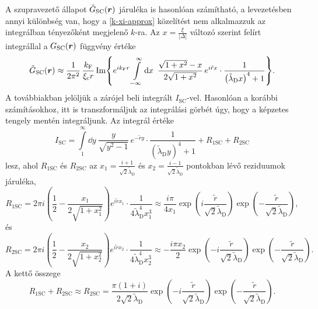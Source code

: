 \documentclass[a4paper,12pt,titlepage]{article}
\newcommand{\RR}{{\vb*{r}}}
\newcommand{\kF}{{k_\text{F}}}
\begin{document}
A szupravezető állapot $\tilde{G}_\text{SC}(\RR)$ járuléka is hasonlóan számítható, a levezetésben annyi különbség van, hogy a \eqref{k-xi-approx} közelítést nem alkalmazzuk az integrálban tényezőként megjelenő $k$-ra.  Az $x = \frac{\xi}{\left| \Delta \right|}$ változó szerint felírt integrállal a $G_\text{SC}(\RR)$ függvény értéke
\begin{equation}
	\tilde{G}_\text{SC}(\RR) \approx \frac{1}{2 \pi^2} \, \frac{\kF}{\xi_\text{c} r} \Im{ e^{i \kF r} \int\limits_{-\infty}^\infty \dd{x} ~ \frac{\sqrt{1 + x^2} - x}{2 \sqrt{1 + x^2}} \, e^{i \tilde{r} x} \cdot \frac{1}{\left( \tilde{\lambda}_\text{D} x \right)^4 + 1} }.
\end{equation}
A továbbiakban jelöljük a zárójel beli integrált $I_\text{SC}$-vel.  Hasonlóan a korábbi számításokhoz, itt is transzformáljuk az integrálási görbét úgy, hogy a képzetes tengely mentén integráljunk.  Az integrál értéke
\begin{equation}
	I_\text{SC} = \int\limits_1^\infty \dd{y} ~ \frac{y}{\sqrt{y^2 - 1}} \, e^{-\tilde{r} y} \cdot \frac{1}{\left( \tilde{\lambda}_\text{D} y \right)^4 + 1} + R_{1 \text{SC}} + R_{2 \text{SC}}
\end{equation}
lesz, ahol $R_{1 \text{SC}}$ és $R_{2 \text{SC}}$ az $x_1 = \frac{i + 1}{\sqrt{2} \tilde{\lambda}_\text{D}}$ és $x_2 = \frac{i - 1}{\sqrt{2} \tilde{\lambda}_\text{D}}$ pontokban lévő reziduumok járuléka,
\begin{equation}
	R_{1 \text{SC}} = 2 \pi i \left( \frac{1}{2} - \frac{x_1}{2 \sqrt{1 + x_1^2}} \right) e^{i \tilde{r} x_1} \cdot \frac{1}{4 \tilde{\lambda}_\text{D}^4 x_1^3} \approx \frac{i \pi}{4 x_1} \exp(i \frac{\tilde{r}}{\sqrt{2} \tilde{\lambda}_\text{D}}) \exp(-\frac{\tilde{r}}{\sqrt{2} \tilde{\lambda}_\text{D}}),
\end{equation}
és
\begin{equation}
	R_{2 \text{SC}} = 2 \pi i \left( \frac{1}{2} - \frac{x_2}{2 \sqrt{1 + x_2^2}} \right) e^{i \tilde{r} x_2} \cdot \frac{1}{4 \tilde{\lambda}_\text{D}^4 x_2^3} \approx -\frac{i \pi x_2}{2} \exp(-i \frac{\tilde{r}}{\sqrt{2} \tilde{\lambda}_\text{D}}) \exp(-\frac{\tilde{r}}{\sqrt{2} \tilde{\lambda}_\text{D}}).
\end{equation}
A kettő összege
\begin{equation}
	R_{1 \text{SC}} + R_{2 \text{SC}} \approx R_{2 \text{SC}} = \frac{\pi \left( 1 + i \right)}{2 \sqrt{2} \tilde{\lambda}_\text{D}} \exp(-i \frac{\tilde{r}}{\sqrt{2} \tilde{\lambda}_\text{D}}) \exp(-\frac{\tilde{r}}{\sqrt{2} \tilde{\lambda}_\text{D}}).
\end{equation}
\end{document}
